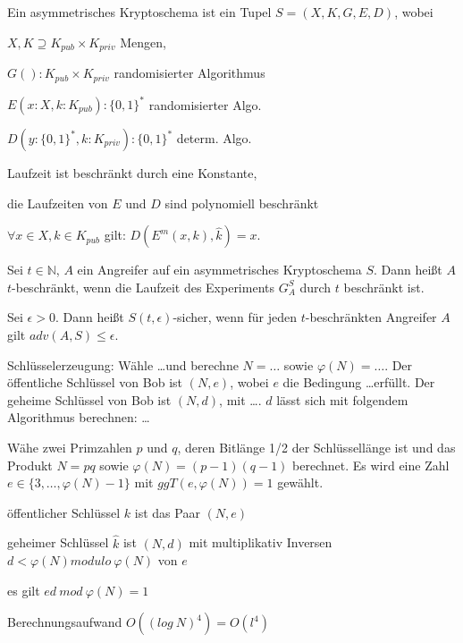 \documentclass[avery5371, frame]{flashcards}
\begin{document}
\begin{flashcard}{Ein asymmetrisches Kryptoschema ist ein Tupel $S= (X,K,G,E,D)$, wobei}
    \begin{itemize*}
        \item $X,K\supseteq K_{pub} \times K_{priv}$ Mengen,
        \item $G():K_{pub} \times K_{priv}$ randomisierter Algorithmus
        \item $E(x:X,k:K_{pub}):\{0,1\}^*$ randomisierter Algo.
        \item $D(y:\{0,1\}^*,k:K_{priv}):\{0,1\}^*$ determ. Algo.
        \item Laufzeit ist beschränkt durch eine Konstante,
        \item die Laufzeiten von $E$ und $D$ sind polynomiell beschränkt
        \item $\forall x\in X,k\in K_{pub}$ gilt: $D(E^m (x,k),\hat{k}) =x$.
    \end{itemize*}
\end{flashcard}

\begin{flashcard}{ Sei $t\in\mathbb{N}$, $A$ ein Angreifer auf ein asymmetrisches Kryptoschema $S$. Dann heißt $A$ $t$-beschränkt, wenn }
    die Laufzeit des Experiments $G^S_A$ durch $t$ beschränkt ist.
\end{flashcard}

\begin{flashcard}{Sei $\epsilon >0$. Dann heißt $S(t,\epsilon)$-sicher, wenn }
    für jeden $t$-beschränkten Angreifer $A$ gilt $adv(A,S)\leq \epsilon$.
\end{flashcard}

\begin{flashcard}{Schlüsselerzeugung: Wähle \dots und berechne $N=\dots$ sowie $\varphi(N)=\dots$. Der öffentliche Schlüssel von Bob ist $(N,e)$, wobei $e$ die Bedingung \dots erfüllt. Der geheime Schlüssel von Bob ist $(N,d)$, mit \dots. $d$ lässt sich mit folgendem Algorithmus berechnen: \dots}

    Wähe zwei Primzahlen $p$ und $q$, deren Bitlänge 1/2 der Schlüssellänge ist und das Produkt $N=pq$ sowie $\varphi(N)=(p-1)(q-1)$ berechnet.
    Es wird eine Zahl $e\in\{3,\dots,\varphi(N)-1\}$ mit $ggT(e,\varphi(N)) = 1$ gewählt.

    \begin{itemize*}
        \item öffentlicher Schlüssel $k$ ist das Paar $(N,e)$
        \item geheimer Schlüssel $\hat{k}$ ist $(N,d)$ mit multiplikativ Inversen $d<\varphi(N) modulo\ \varphi(N)$ von $e$
        \item es gilt $ed\ mod\ \varphi(N) = 1$
        \item Berechnungsaufwand $O((log\ N)^4) =O(l^4)$
    \end{itemize*}
\end{flashcard}
\end{document}
